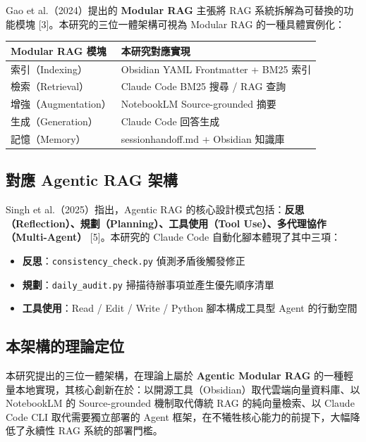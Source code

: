 Gao et al.（2024）提出的 \textbf{Modular RAG} 主張將 RAG
系統拆解為可替換的功能模塊 {[}3{]}。本研究的三位一體架構可視為 Modular
RAG 的一種具體實例化：

{\def\LTcaptype{none} %
\begin{longtable}[]{@{}ll@{}}
\toprule\noalign{}
Modular RAG 模塊 & 本研究對應實現 \\
\midrule\noalign{}
\endhead
\bottomrule\noalign{}
\endlastfoot
索引（Indexing） & Obsidian YAML Frontmatter + BM25 索引 \\
檢索（Retrieval） & Claude Code BM25 搜尋 / RAG 查詢 \\
增強（Augmentation） & NotebookLM Source-grounded 摘要 \\
生成（Generation） & Claude Code 回答生成 \\
記憶（Memory） & sessionhandoff.md + Obsidian 知識庫 \\
\end{longtable}
}

\subsection{對應 Agentic RAG
架構}\label{ux5c0dux61c9-agentic-rag-ux67b6ux69cb}

Singh et al.（2025）指出，Agentic RAG
的核心設計模式包括：\textbf{反思（Reflection）、規劃（Planning）、工具使用（Tool
Use）、多代理協作（Multi-Agent）} {[}5{]}。本研究的 Claude Code
自動化腳本體現了其中三項：

\begin{itemize}
\tightlist
\item
  \textbf{反思}：\texttt{consistency\_check.py} 偵測矛盾後觸發修正
\item
  \textbf{規劃}：\texttt{daily\_audit.py} 掃描待辦事項並產生優先順序清單
\item
  \textbf{工具使用}：Read / Edit / Write / Python 腳本構成工具型 Agent
  的行動空間
\end{itemize}

\subsection{本架構的理論定位}\label{ux672cux67b6ux69cbux7684ux7406ux8ad6ux5b9aux4f4d}

本研究提出的三位一體架構，在理論上屬於 \textbf{Agentic Modular RAG}
的一種輕量本地實現，其核心創新在於：以開源工具（Obsidian）取代雲端向量資料庫、以
NotebookLM 的 Source-grounded 機制取代傳統 RAG 的純向量檢索、以 Claude
Code CLI 取代需要獨立部署的 Agent
框架，在不犧牲核心能力的前提下，大幅降低了永續性 RAG 系統的部署門檻。

